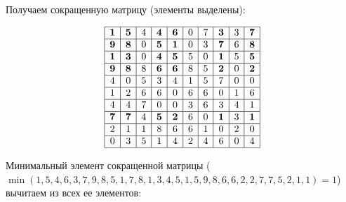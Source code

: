 \documentclass[17pt]{extarticle}
\begin{document}
Получаем сокращенную матрицу (элементы выделены):

\[
    \begin{array}{|*{10}{c|}}
        \hline
        \textbf{1} & \textbf{5} & 4 & \textbf{4} & \textbf{6} & 0 & 7 & \textbf{3} & 3 & \textbf{7} \\
        \hline
        \textbf{9} & \textbf{8} & 0 & \textbf{5} & \textbf{1} & 0 & 3 & \textbf{7} & 6 & \textbf{8} \\
        \hline
        \textbf{1} & \textbf{3} & 0 & \textbf{4} & \textbf{5} & 5 & 0 & \textbf{1} & 5 & \textbf{5} \\
        \hline
        \textbf{9} & \textbf{8} & 8 & \textbf{6} & \textbf{6} & 8 & 5 & \textbf{2} & 0 & \textbf{2} \\
        \hline
        4          & 0          & 5 & 3          & 4          & 1 & 5 & 7          & 0 & 0          \\
        \hline
        1          & 2          & 6 & 6          & 0          & 6 & 6 & 0          & 1 & 6          \\
        \hline
        4          & 4          & 7 & 0          & 0          & 3 & 6 & 3          & 4 & 1          \\
        \hline
        \textbf{7} & \textbf{7} & 4 & \textbf{5} & \textbf{2} & 6 & 0 & \textbf{1} & 3 & \textbf{1} \\
        \hline
        2          & 1          & 1 & 8          & 6          & 6 & 1 & 0          & 2 & 0          \\
        \hline
        0          & 3          & 5 & 1          & 4          & 2 & 4 & 6          & 0 & 4          \\
        \hline
    \end{array}
\]

Минимальный элемент сокращенной матрицы (\(\min(1, 5, 4, 6, 3, 7, 9, 8, 5, 1, 7, 8, 1, 3, 4, 5, 1, 5, 9, 8, 6, 6, 2, 2, 7, 7, 5, 2, 1, 1) = 1\)) вычитаем из всех ее элементов:
\end{document}
